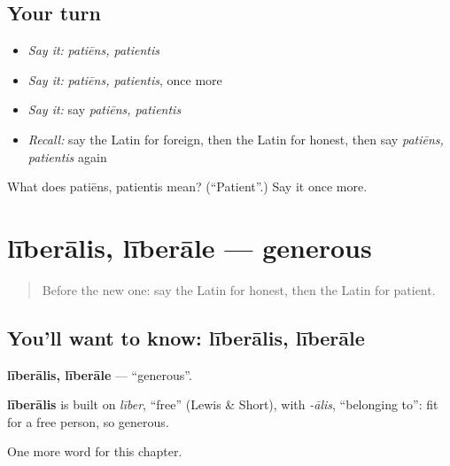 \subsection*{Your turn}
\begin{itemize}
\raggedright
  \item \emph{Say it:} \emph{patiēns, patientis}
  \item \emph{Say it:} \emph{patiēns, patientis}, once more
  \item \emph{Say it:} say \emph{patiēns, patientis}
  \item \emph{Recall:} say the Latin for foreign, then the Latin for honest, then say \emph{patiēns, patientis} again
\end{itemize}

\begin{tcolorbox}[breakable,colback=teal!4,colframe=teal!35!black,title={Before you move on}]
What does patiēns, patientis mean? (\textquotedblleft{}Patient\textquotedblright{}.) Say it once more.
\end{tcolorbox}
\section[līberālis, līberāle]{līberālis, līberāle — generous}

\label{lesson:LA-C213-liberalis}



\begin{quote}
Before the new one: say the Latin for honest, then the Latin for patient.
\end{quote}

\subsection*{You'll want to know: līberālis, līberāle}
\textbf{līberālis, līberāle} — \textquotedblleft{}generous\textquotedblright{}.

\begin{cousinweb}
\textbf{līberālis} is built on \emph{līber}, \textquotedblleft{}free\textquotedblright{} (Lewis \& Short), with \emph{-ālis}, \textquotedblleft{}belonging to\textquotedblright{}: fit for a free person, so generous.
\end{cousinweb}

\begin{grammarlens}[title={What you've built}]
One more word for this chapter.
\end{grammarlens}

